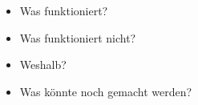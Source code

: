 \begin{itemize}
    \item
        Was funktioniert?
    \item
        Was funktioniert nicht?
    \item
        Weshalb?
    \item
        Was k\"onnte noch gemacht werden?
\end{itemize}
